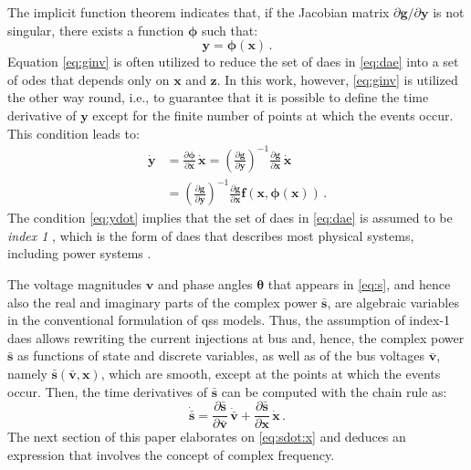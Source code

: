 \documentclass[journal, twocolumn, letter]{IEEEtran}
\newcommand{\bfg}[1]{\boldsymbol{#1}}
\newcommand{\bfp}[1]{\bar{\boldsymbol{#1}}}
\newcommand{\fp}[2]{\frac{\partial #1}{\partial #2}}
\newcommand{\xdot}{\dot{\bfg x}}
\newcommand{\vvec}{\bfp v}
\newcommand{\vdot}{\dot{\bfp v}}
\newcommand{\svec}{\bar{\bfg s}}
\newcommand{\sdot}{\dot{\bar{\bfg s}}}
\newcommand{\tvec}{\bfg \theta}
\begin{document}
The implicit function theorem indicates that, if the Jacobian matrix
$\partial\bfg g / \partial \bfg y$ is not singular, there exists a
function $\bfg \phi$ such that:
\begin{equation}
  \label{eq:ginv}
  \bfg y = \bfg \phi(\bfg x) \, .
\end{equation}
Equation \eqref{eq:ginv} is often utilized to reduce the set of
\acp{dae} in \eqref{eq:dae} into a set of \acp{ode} that depends only
on $\bfg x$ and $\bfg z$.  In this work, however, \eqref{eq:ginv} is
utilized the other way round, i.e., to guarantee that it is possible
to define the time derivative of $\bfg y$ except for the finite number
of points at which the events occur.  This condition leads to:
\begin{equation}
  \label{eq:ydot}
  \begin{aligned}
    \dot{\bfg y} &= \fp{\bfg \phi}{\bfg x} \, \dot{\bfg x} =
    \left (\fp{\bfg g}{\bfg y} \right )^{-1} \fp{\bfg g}{\bfg x} \, \dot{\bfg x} \\
    &= \left (\fp{\bfg g}{\bfg y} \right )^{-1} \fp{\bfg g}{\bfg x}
    \bfg f(\bfg x, \bfg \phi(\bfg x)) \, .
  \end{aligned}
\end{equation} 
The condition \eqref{eq:ydot} implies that the set of \acp{dae} in
\eqref{eq:dae} is assumed to be \textit{index 1} \cite{Ascher:1998},
which is the form of \acp{dae} that describes most physical systems,
including power systems \cite{Milano:2010}.

The voltage magnitudes $\bfg v$ and phase angles $\tvec$ that appears
in \eqref{eq:s}, and hence also the real and imaginary parts of the
complex power $\svec$, are algebraic variables in the conventional
formulation of \ac{qss} models.  Thus, the assumption of index-1
\acp{dae} allows rewriting the current injections at bus and, hence,
the complex power $\svec$ as functions of state and discrete
variables, as well as of the bus voltages $\vvec$, namely
$\svec(\vvec, \bfg x)$,
which are smooth, except at the points at which the events occur.
Then, the time derivatives of $\svec$ can be computed with the chain
rule as:
\begin{equation}
  \label{eq:sdot:x}
  \sdot = \frac{\partial \svec}{\partial \vvec} \, \vdot +
  \frac{\partial \svec}{\partial \bfg x} \, \xdot \, .
\end{equation}
The next section of this paper elaborates on \eqref{eq:sdot:x} and
deduces an expression that involves the concept of complex frequency.
\end{document}

